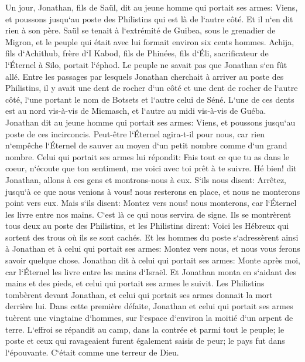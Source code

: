 \verse Un jour, Jonathan, fils de Saül, dit au jeune homme qui portait ses armes: Viens, et poussons jusqu`au poste des Philistins qui est là de l`autre côté. Et il n`en dit rien à son père. 
\verse Saül se tenait à l`extrémité de Guibea, sous le grenadier de Migron, et le peuple qui était avec lui formait environ six cents hommes. 
\verse Achija, fils d`Achithub, frère d`I Kabod, fils de Phinées, fils d`Éli, sacrificateur de l`Éternel à Silo, portait l`éphod. Le peuple ne savait pas que Jonathan s`en fût allé. 
\verse Entre les passages par lesquels Jonathan cherchait à arriver au poste des Philistins, il y avait une dent de rocher d`un côté et une dent de rocher de l`autre côté, l`une portant le nom de Botsets et l`autre celui de Séné. 
\verse L`une de ces dents est au nord vis-à-vis de Micmasch, et l`autre au midi vis-à-vis de Guéba. 
\verse Jonathan dit au jeune homme qui portait ses armes: Viens, et poussons jusqu`au poste de ces incirconcis. Peut-être l`Éternel agira-t-il pour nous, car rien n`empêche l`Éternel de sauver au moyen d`un petit nombre comme d`un grand nombre. 
\verse Celui qui portait ses armes lui répondit: Fais tout ce que tu as dans le coeur, n`écoute que ton sentiment, me voici avec toi prêt à te suivre. 
\verse Hé bien! dit Jonathan, allons à ces gens et montrons-nous à eux. 
\verse S`ils nous disent: Arrêtez, jusqu`à ce que nous venions à vous! nous resterons en place, et nous ne monterons point vers eux. 
\verse Mais s`ils disent: Montez vers nous! nous monterons, car l`Éternel les livre entre nos mains. C`est là ce qui nous servira de signe. 
\verse Ils se montrèrent tous deux au poste des Philistins, et les Philistins dirent: Voici les Hébreux qui sortent des trous où ils se sont cachés. 
\verse Et les hommes du poste s`adressèrent ainsi à Jonathan et à celui qui portait ses armes: Montez vers nous, et nous vous ferons savoir quelque chose. Jonathan dit à celui qui portait ses armes: Monte après moi, car l`Éternel les livre entre les mains d`Israël. 
\verse Et Jonathan monta en s`aidant des mains et des pieds, et celui qui portait ses armes le suivit. Les Philistins tombèrent devant Jonathan, et celui qui portait ses armes donnait la mort derrière lui. 
\verse Dans cette première défaite, Jonathan et celui qui portait ses armes tuèrent une vingtaine d`hommes, sur l`espace d`environ la moitié d`un arpent de terre. 
\verse L`effroi se répandit au camp, dans la contrée et parmi tout le peuple; le poste et ceux qui ravageaient furent également saisis de peur; le pays fut dans l`épouvante. C`était comme une terreur de Dieu. 
